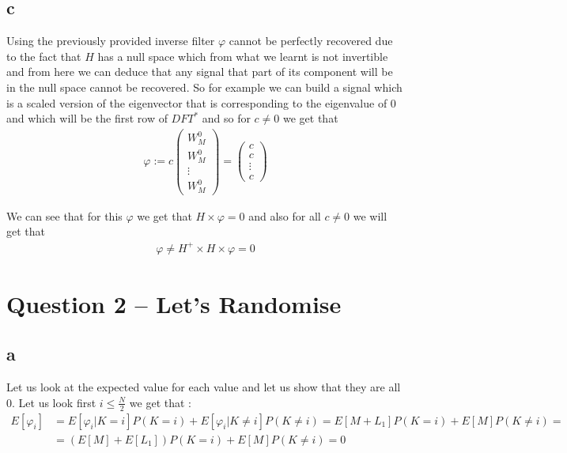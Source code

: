 \documentclass[a4paper]{article}
\begin{document}
\subsection*{c}
Using the previously provided inverse filter $\varphi$ cannot be perfectly recovered due to the fact that $H$ has a null space which from what we learnt is not invertible and from here we can deduce that any signal that part of its component will be in the null space cannot be recovered. So for example we can build a signal which is a scaled version of the eigenvector that is corresponding to the eigenvalue of 0 and which will be the first row of $DFT^{*}$ and so for $c \neq 0$ we get that
\begin{align}
    \varphi := c \begin{pmatrix}
        W^{0}_{M} \\ W^{0}_{M} \\ \vdots \\ W^{0}_{M}
    \end{pmatrix} = \begin{pmatrix}
        c \\ c \\ \vdots \\ c
    \end{pmatrix}
\end{align}

We can see that for this $\varphi$ we get that $H \times \varphi = 0$ and also for all $c \neq 0$ we will get that
\begin{align}
    \varphi \neq H^{+} \times H \times \varphi = 0
\end{align}


\newpage
\section*{Question 2 -- Let’s Randomise}


\subsection*{a}
Let us look at the expected value for each value and let us show that they are all $0$.
Let us look first $i \leq \frac{N}{2}$ we get that :
\begin{align}
    E[\varphi_{i}] &= E[\varphi_{i} | K=i] P(K=i) + E[\varphi_{i} | K\neq i] P(K \neq i) =
    E[M+L_{1}] P(K=i) + E[M] P(K \neq i) = \nonumber \\[2ex] 
    &= (E[M]+E[L_{1}]) P(K=i) + E[M] P(K \neq i) = 0
\end{align}
\end{document}
